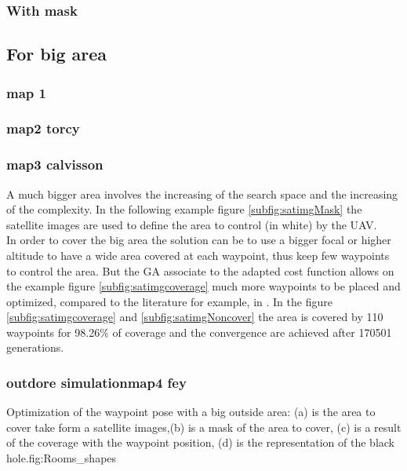 	


	\subsubsection{With mask}
	\subsection{For big area}
		\subsubsection{map 1}
		\subsubsection{map2 torcy}
		\subsubsection{map3 calvisson}
		
		A much bigger area involves the increasing of the search space and the increasing of the complexity. 
In the following example figure \ref{subfig:satimgMask} the satellite images are used to define the area to control (in white)  by the UAV. \\
In order to cover the big area the solution can be to use a bigger focal or higher altitude to have a wide area covered at each waypoint, thus keep few waypoints to control the area. But the GA associate to the adapted cost function allows on the example figure \ref{subfig:satimgcoverage} much more waypoints to be placed and optimized, compared to the literature for example, in \cite{c10,c11}. In the figure \ref{subfig:satimgcoverage} and \ref{subfig:satimgNoncover} the area is covered by 110 waypoints for 98.26$\%$ of coverage and the convergence are achieved after 170501 generations.\\

\subsubsection{outdore simulationmap4 fey}\label{fig:Rooms_shapes}
\begin{mfigures}[!]{  Optimization of the waypoint pose with a big outside area: (a) is the area to cover take form a satellite images,(b) is a mask of the area to cover, (c) is a result of the coverage with the waypoint position, (d) is the representation of the black hole.}{fig:Rooms_shapes} \centering
{}
\hspace{1cm}
\hspace{1cm}
\tabsimupose
\end{mfigures}

